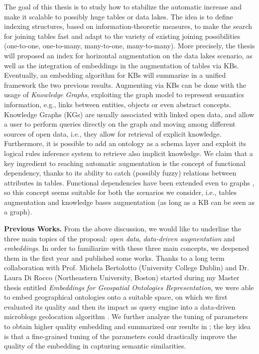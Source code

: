 The goal of this thesis is to study how to stabilize the automatic increase and make it scalable to possibly huge tables or data lakes. The idea is to define indexing structures, based on information-theoretic measures, to make the search for joining tables fast and adapt to the variety of existing joining possibilities (one-to-one, one-to-many, many-to-one, many-to-many). More precisely, the thesis will proposed an index for horizontal augmentation on the data lakes scenario, as well as the integration of embeddings in the augmentation of tables via KBs. Eventually, an embedding algorithm for KBs will summarize in a unified framework the two previous results. Augmenting via KBs can be done with the usage of \textit{Knowledge Graphs}, exploiting the graph model to represent semantics information, e.g., links between entities, objects or even abstract concepts. Knowledge Graphs (KGs) are usually associated with linked open data, and allow a user to perform queries directly on the graph and moving among different sources of open data, i.e., they allow for retrieval of explicit knowledge. Furthermore, it is possible to add an ontology as a schema layer and exploit its logical rules inference system to retrieve also implicit knowledge.
We claim that a key ingredient to reaching automatic augmentation is the concept of functional dependency, thanks to its ability to catch (possibly fuzzy) relations between attributes in tables. Functional dependencies have been extended even to graphs \cite{fan2016functional}, so this concept seems suitable for both the scenarios we consider, i.e., tables augmentation and knowledge bases augmentation (as long as a KB can be seen as a graph). 


\bigbreak
\textbf{Previous Works.} From the above discussion, we would like to underline the three main topics of the proposal: \textit{open data}, \textit{data-driven augmentation} and \textit{embeddings}. In order to familiarize with these three main concepts, we deepened them in the first year and published some works. Thanks to a long term collaboration with Prof. Michela Bertolotto (University College Dublin) and Dr. Laura Di Rocco (Northeastern University, Boston) started during my Master thesis entitled \textit{Embeddings for Geospatial Ontologies Representation}, we were able to embed geographical ontologies onto a suitable space, on which we first evaluated its quality \cite{dassereto2019evaluating} and then its impact as query engine into a data-driven microblogs geolocation algorithm \cite{di2020sherloc}. We further analyze the tuning of parameters to obtain higher quality embedding and summarized our results in \cite{dassereto2020tuning}; the key idea is that a fine-grained tuning of the parameters could drastically improve the quality of the embedding in capturing semantic similarities.

